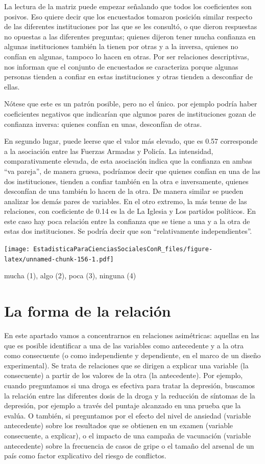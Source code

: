 \documentclass[]{book}
\begin{document}
La lectura de la matriz puede empezar señalando que todos los coeficientes son posivos. Eso quiere decir que los encuestados tomaron posición similar respecto de las diferentes instituciones por las que se les consultó, o que dieron respuestas no opuestas a las diferentes preguntas; quienes dijeron tener mucha confianza en algunas instituciones también la tienen por otras y a la inversa, quienes no confían en algunas, tampoco lo hacen en otras. Por ser relaciones descriptivas, nos informan que el conjunto de encuestados se caracteriza porque algunas personas tienden a confiar en estas instituciones y otras tienden a desconfiar de ellas.

Nótese que este es un patrón posible, pero no el único. por ejemplo podría haber coeficientes negativos que indicarían que algunos pares de instituciones gozan de confianza inversa: quienes confían en unas, desconfían de otras.

En segundo lugar, puede leerse que el valor más elevado, que es 0.57 corresponde a la asociación entre las Fuerzas Armadas y Policía. La intensidad, comparativamente elevada, de esta asociación indica que la confianza en ambas ``va pareja'', de manera gruesa, podríamos decir que quienes confían en una de las dos instituciones, tienden a confiar también en la otra e inversamente, quienes desconfían de una también lo hacen de la otra. De manera similar se pueden analizar los demás pares de variables.
En el otro extremo, la más tenue de las relaciones, con coeficiente de 0.14 es la de La Iglesia y Los partidos políticos. En este caso hay poca relación entre la confianza que se tiene a una y a la otra de estas dos instituciones. Se podría decir que son ``relativamente independientes''.

\texttt{[image: EstadisticaParaCienciasSocialesConR\_files/figure-latex/unnamed-chunk-156-1.pdf]}

mucha (1), algo (2), poca (3), ninguna (4)

\hypertarget{la-forma-de-la-relaciuxf3n}{%
\section{La forma de la relación}\label{la-forma-de-la-relaciuxf3n}}

En este apartado vamos a concentrarnos en relaciones asimétricas: aquellas en las que es posible identificar a una de las variables como antecedente y a la otra como consecuente (o como independiente y
dependiente, en el marco de un diseño experimental). Se trata de
relaciones que se dirigen a explicar una variable (la consecuente) a
partir de los valores de la otra (la antecedente). Por ejemplo, cuando preguntamos si una droga es efectiva para tratar la depresión, buscamos la relación entre las diferentes dosis de la droga y la reducción de síntomas de la depresión, por ejemplo a través del puntaje alcanzado en una prueba que la evalúa. O también, si preguntamos por el efecto del nivel de ansiedad (variable antecedente) sobre los resultados que se obtienen en un examen (variable consecuente, a explicar), o el impacto de una campaña de vacunación (variable antecedente) sobre la frecuencia de casos de gripe o el tamaño del arsenal de un país como factor explicativo del riesgo de conflictos.
\end{document}
